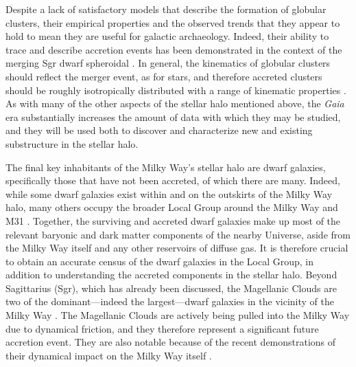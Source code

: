 Despite a lack of satisfactory models that describe the formation of globular clusters, their empirical properties and the observed trends that they appear to hold to mean they are useful for galactic archaeology. Indeed, their ability to trace and describe accretion events has been demonstrated in the context of the merging Sgr dwarf spheroidal \parencite{law10}. In general, the kinematics of globular clusters should reflect the merger event, as for stars, and therefore accreted clusters should be roughly isotropically distributed with a range of kinematic properties \parencite[linking back to the hypothesis of ][]{searle78}. As with many of the other aspects of the stellar halo mentioned above, the \textit{Gaia} era substantially increases the amount of data with which they may be studied, and they will be used both to discover and characterize new and existing substructure in the stellar halo.

The final key inhabitants of the Milky Way's stellar halo are dwarf galaxies, specifically those that have not been accreted, of which there are many. Indeed, while some dwarf galaxies exist within and on the outskirts of the Milky Way halo, many others occupy the broader Local Group around the Milky Way and M31 \parencite[for reviews and compendiums see][]{tolstoy09,mcconnachie12,simon19}. Together, the surviving and accreted dwarf galaxies make up most of the relevant baryonic and dark matter components of the nearby Universe, aside from the Milky Way itself and any other reservoirs of diffuse gas. It is therefore crucial to obtain an accurate census of the dwarf galaxies in the Local Group, in addition to understanding the accreted components in the stellar halo. Beyond Sagittarius (Sgr), which has already been discussed, the Magellanic Clouds are two of the dominant---indeed the largest---dwarf galaxies in the vicinity of the Milky Way \parencite[they are essentially a field of study unto themselves; see][]{westerlund97}. The Magellanic Clouds are actively being pulled into the Milky Way due to dynamical friction, and they therefore represent a significant future accretion event. They are also notable because of the recent demonstrations of their dynamical impact on the Milky Way itself \parencite{erkal19,garavitocamargo19}.

